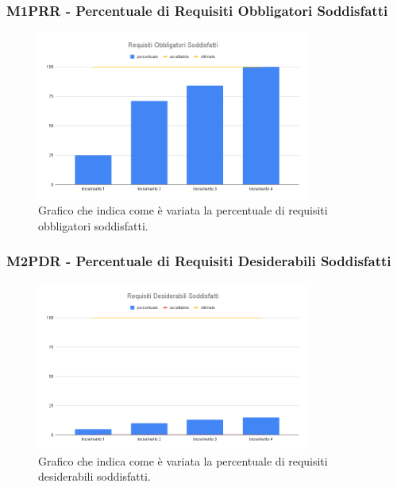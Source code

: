 \subsubsection{M1PRR - Percentuale di Requisiti Obbligatori Soddisfatti}
\begin{figure}[H]
    \centering\includegraphics[width=0.8\textwidth, height=0.8\textheight,keepaspectratio]{images/PB-Requisiti-Obbligatori-Soddisfatti.png}
    \caption{Grafico che indica come è variata la percentuale di requisiti obbligatori soddisfatti.}
\end{figure}  

\subsubsection{M2PDR - Percentuale di Requisiti Desiderabili Soddisfatti}
\begin{figure}[H]
    \centering\includegraphics[width=0.8\textwidth, height=0.8\textheight,keepaspectratio]{images/PB-Requisiti-Desiderabili-Soddisfatti.png}
    \caption{Grafico che indica come è variata la percentuale di requisiti desiderabili soddisfatti.}
\end{figure}  

